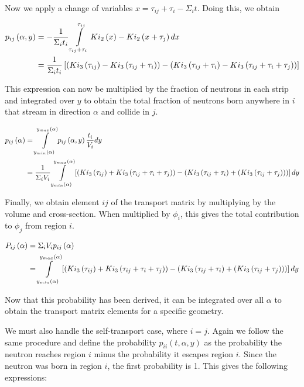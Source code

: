Now we apply a change of variables $x=\tau_{ij} + \tau_i - \Sigma_i t$.  Doing this, we obtain

\begin{align}
p_{ij}\left(\alpha, y\right) &= -\frac{1}{\Sigma_i t_i} \intop_{\tau_{ij} + \tau_i}^{\tau_{ij}} Ki_2\left(x\right) - Ki_2\left(x + \tau_j\right) dx \nonumber \\
&= \frac{1}{\Sigma_i t_i} \left[\left(Ki_3\left(\tau_{ij}\right) - Ki_3\left(\tau_{ij} + \tau_i\right)\right) - \left(Ki_3\left(\tau_{ij} + \tau_i\right) - Ki_3\left(\tau_{ij} + \tau_i + \tau_j\right)\right)\right]
\end{align}

This expression can now be multiplied by the fraction of neutrons in each strip and integrated over $y$ to obtain the total fraction of neutrons born anywhere in $i$ that stream in direction $\alpha$ and collide in $j$.

\begin{align}
p_{ij}\left(\alpha\right) &= \intop_{y_{min}\left(\alpha\right)}^{y_{max}\left(\alpha\right)} p_{ij}\left(\alpha,y\right) \frac{t_i}{V_i} dy \nonumber\\
&= \frac{1}{\Sigma_i V_i} \intop_{y_{min}\left(\alpha\right)}^{y_{max}\left(\alpha\right)} \left[\left(Ki_3\left(\tau_{ij}\right) + Ki_3\left(\tau_{ij} + \tau_i + \tau_j\right)\right) - \left(Ki_3\left(\tau_{ij} + \tau_i\right) + \left(Ki_3\left(\tau_{ij} + \tau_j\right)\right)\right)\right] dy
\end{align}

Finally, we obtain element $ij$ of the transport matrix by multiplying by the volume and cross-section.  When multiplied by $\phi_i$, this gives the total contribution to $\phi_j$ from region $i$.

\begin{align}\label{e:CPPij}
P_{ij}\left(\alpha\right) &= \Sigma_i V_i p_{ij}\left(\alpha\right) \nonumber \\
&= \intop_{y_{min}\left(\alpha\right)}^{y_{max}\left(\alpha\right)} \left[\left(Ki_3\left(\tau_{ij}\right) + Ki_3\left(\tau_{ij} + \tau_i + \tau_j\right)\right) - \left(Ki_3\left(\tau_{ij} + \tau_i\right) + \left(Ki_3\left(\tau_{ij} + \tau_j\right)\right)\right)\right] dy
\end{align}

Now that this probability has been derived, it can be integrated over all $\alpha$ to obtain the transport matrix elements for a specific geometry.

We must also handle the self-transport case, where $i=j$.  Again we follow the same procedure and define the probability $p_{ii}\left(t, \alpha, y\right)$ as the probability the neutron reaches region $i$ minus the probability it escapes region $i$.  Since the neutron was born in region $i$, the first probability is 1.  This gives the following expressions:

